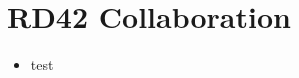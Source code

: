 \section*{RD42 Collaboration}
\begin{frame}{}

	\begin{itemize}\itemfill
		\item test
	\end{itemize}
	
\end{frame}
